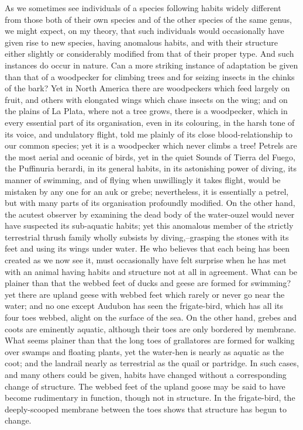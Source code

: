 As we sometimes see individuals of a species following habits widely different from those both of their own species and of the other species of the same genus, we might expect, on my theory, that such individuals would occasionally have given rise to new species, having anomalous habits, and with their structure either slightly or considerably modified from that of their proper type. And such instances do occur in nature. Can a more striking instance of adaptation be given than that of a woodpecker for climbing trees and for seizing insects in the chinks of the bark? Yet in North America there are woodpeckers which feed largely on fruit, and others with elongated wings which chase insects on the wing; and on the plains of La Plata, where not a tree grows, there is a woodpecker, which in every essential part of its organisation, even in its colouring, in the harsh tone of its voice, and undulatory flight, told me plainly of its close blood-relationship to our common species; yet it is a woodpecker which never climbs a tree!
Petrels are the most aerial and oceanic of birds, yet in the quiet Sounds of Tierra del Fuego, the Puffinuria berardi, in its general habits, in its astonishing power of diving, its manner of swimming, and of flying when unwillingly it takes flight, would be mistaken by any one for an auk or grebe; nevertheless, it is essentially a petrel, but with many parts of its organisation profoundly modified. On the other hand, the acutest observer by examining the dead body of the water-ouzel would never have suspected its sub-aquatic habits; yet this anomalous member of the strictly terrestrial thrush family wholly subsists by diving,--grasping the stones with its feet and using its wings under water.
He who believes that each being has been created as we now see it, must occasionally have felt surprise when he has met with an animal having habits and structure not at all in agreement. What can be plainer than that the webbed feet of ducks and geese are formed for swimming? yet there are upland geese with webbed feet which rarely or never go near the water; and no one except Audubon has seen the frigate-bird, which has all its four toes webbed, alight on the surface of the sea. On the other hand, grebes and coots are eminently aquatic, although their toes are only bordered by membrane. What seems plainer than that the long toes of grallatores are formed for walking over swamps and floating plants, yet the water-hen is nearly as aquatic as the coot; and the landrail nearly as terrestrial as the quail or partridge. In such cases, and many others could be given, habits have changed without a corresponding change of structure. The webbed feet of the upland goose may be said to have become rudimentary in function, though not in structure. In the frigate-bird, the deeply-scooped membrane between the toes shows that structure has begun to change.
